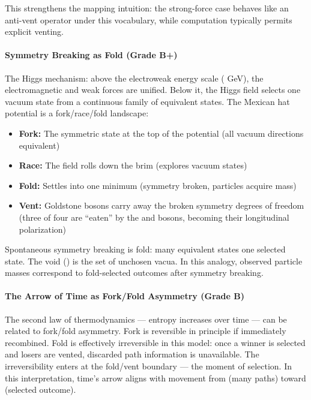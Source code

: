 \documentclass[
]{article}
\providecommand{\tightlist}{%
  \setlength{\itemsep}{0pt}\setlength{\parskip}{0pt}}
\begin{document}
This strengthens the mapping intuition: the strong-force case behaves
like an anti-vent operator under this vocabulary, while computation
typically permits explicit venting.

\paragraph{\texorpdfstring{\textbf{Symmetry Breaking as Fold (Grade
B+)}}{Symmetry Breaking as Fold (Grade B+)}}\label{symmetry-breaking-as-fold-grade-b}

The Higgs mechanism: above the electroweak energy scale ( GeV), the
electromagnetic and weak forces are unified. Below it, the Higgs field
selects one vacuum state from a continuous family of equivalent states.
The Mexican hat potential is a fork/race/fold landscape:

\begin{itemize}
\tightlist
\item
  \textbf{Fork:} The symmetric state at the top of the potential (all
  vacuum directions equivalent)\\
\item
  \textbf{Race:} The field rolls down the brim (explores vacuum
  states)\\
\item
  \textbf{Fold:} Settles into one minimum (symmetry broken, particles
  acquire mass)\\
\item
  \textbf{Vent:} Goldstone bosons carry away the broken symmetry degrees
  of freedom (three of four are ``eaten'' by the and bosons, becoming
  their longitudinal polarization)
\end{itemize}

Spontaneous symmetry breaking is fold: many equivalent states one
selected state. The void () is the set of unchosen vacua. In this
analogy, observed particle masses correspond to fold-selected outcomes
after symmetry breaking.

\paragraph{\texorpdfstring{\textbf{The Arrow of Time as Fork/Fold
Asymmetry (Grade
B)}}{The Arrow of Time as Fork/Fold Asymmetry (Grade B)}}\label{the-arrow-of-time-as-forkfold-asymmetry-grade-b}

The second law of thermodynamics --- entropy increases over time --- can
be related to fork/fold asymmetry. Fork is reversible in principle if
immediately recombined. Fold is effectively irreversible in this model:
once a winner is selected and losers are vented, discarded path
information is unavailable. The irreversibility enters at the fold/vent
boundary --- the moment of selection. In this interpretation, time's
arrow aligns with movement from (many paths) toward (selected outcome).
\end{document}
